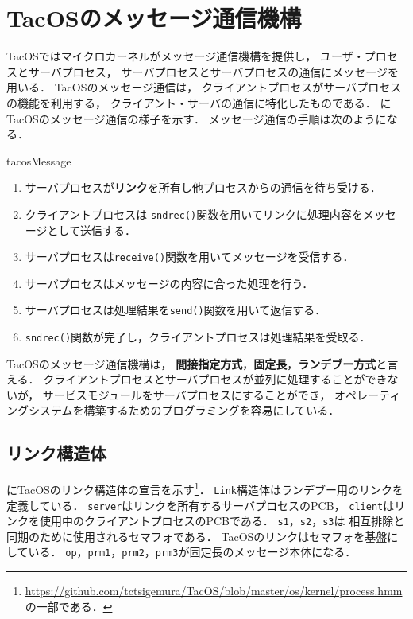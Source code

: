 \section{TacOSのメッセージ通信機構}
\label{tacosIPC}
TacOSではマイクロカーネルがメッセージ通信機構を提供し，
ユーザ・プロセスとサーバプロセス，
サーバプロセスとサーバプロセスの通信にメッセージを用いる．
TacOSのメッセージ通信は，
クライアントプロセスがサーバプロセスの機能を利用する，
クライアント・サーバの通信に特化したものである．
にTacOSのメッセージ通信の様子を示す．
メッセージ通信の手順は次のようになる．

{tacosMessage}

\begin{enumerate}
\item サーバプロセスが{\bf リンク}を所有し他プロセスからの通信を待ち受ける．
\item クライアントプロセスは
{\tt sndrec()}関数を用いてリンクに処理内容をメッセージとして送信する．
\item サーバプロセスは{\tt receive()}関数を用いてメッセージを受信する．
\item サーバプロセスはメッセージの内容に合った処理を行う．
\item サーバプロセスは処理結果を{\tt send()}関数を用いて返信する．
\item {\tt sndrec()}関数が完了し，クライアントプロセスは処理結果を受取る．
\end{enumerate}

TacOSのメッセージ通信機構は，
{\bf 間接指定方式}，{\bf 固定長}，{\bf ランデブー方式}と言える．
クライアントプロセスとサーバプロセスが並列に処理することができないが，
サービスモジュールをサーバプロセスにすることができ，
オペレーティングシステムを構築するためのプログラミングを容易にしている．

\subsection{リンク構造体}
にTacOSのリンク構造体の宣言を示す\footnote{
\url{https://github.com/tctsigemura/TacOS/blob/master/os/kernel/process.hmm}
の一部である．}．
{\tt Link}構造体はランデブー用のリンクを定義している．
{\tt server}はリンクを所有するサーバプロセスのPCB，
{\tt client}はリンクを使用中のクライアントプロセスのPCBである．
{\tt s1}，{\tt s2}，{\tt s3}は
相互排除と同期のために使用されるセマフォである．
TacOSのリンクはセマフォを基盤にしている．
{\tt op}，{\tt prm1}，{\tt prm2}，{\tt prm3}が固定長のメッセージ本体になる．

